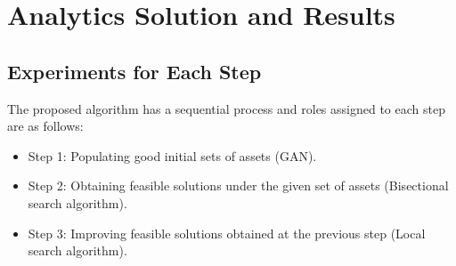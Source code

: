 \documentclass[11pt]{article}
\begin{document}



\section*{Analytics Solution and Results}
\setcounter{subsection}{0}

\subsection{Experiments for Each Step}

The proposed algorithm has a sequential process and roles assigned to each step are as follows:
\begin{itemize}
	\item Step 1: Populating good initial sets of assets (GAN).
	\item Step 2: Obtaining feasible solutions under the given set of assets (Bisectional search algorithm).
	\item Step 3: Improving feasible solutions obtained at the previous step (Local search algorithm).
\end{itemize}
	
\end{document}
